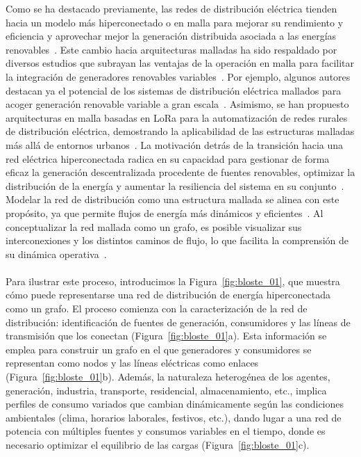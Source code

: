 Como se ha destacado previamente, las redes de distribución eléctrica tienden hacia un modelo más hiperconectado o en malla para mejorar su rendimiento y eficiencia y aprovechar mejor la generación distribuida asociada a las energías renovables~\cite{kafle2016towards}. Este cambio hacia arquitecturas malladas ha sido respaldado por diversos estudios que subrayan las ventajas de la operación en malla para facilitar la integración de generadores renovables variables~\cite{cruz2018meshed,cruz2018prospects}. Por ejemplo, algunos autores destacan ya el potencial de los sistemas de distribución eléctrica mallados para acoger generación renovable variable a gran escala~\cite{cruz2018prospects}. Asimismo, se han propuesto arquitecturas en malla basadas en LoRa para la automatización de redes rurales de distribución eléctrica, demostrando la aplicabilidad de las estructuras malladas más allá de entornos urbanos~\cite{prade2020lora}. La motivación detrás de la transición hacia una red eléctrica hiperconectada radica en su capacidad para gestionar de forma eficaz la generación descentralizada procedente de fuentes renovables, optimizar la distribución de la energía y aumentar la resiliencia del sistema en su conjunto~\cite{kafle2016towards}. Modelar la red de distribución como una estructura mallada se alinea con este propósito, ya que permite flujos de energía más dinámicos y eficientes~\cite{cruz2018meshed}. Al conceptualizar la red mallada como un grafo, es posible visualizar sus interconexiones y los distintos caminos de flujo, lo que facilita la comprensión de su dinámica operativa~\cite{zhou2021mesh}.\\
\\
Para ilustrar este proceso, introducimos la Figura~\ref{fig:bloste_01}, que muestra cómo puede representarse una red de distribución de energía hiperconectada como un grafo. El proceso comienza con la caracterización de la red de distribución: identificación de fuentes de generación, consumidores y las líneas de transmisión que los conectan (Figura~\ref{fig:bloste_01}a). Esta información se emplea para construir un grafo en el que generadores y consumidores se representan como nodos y las líneas eléctricas como enlaces (Figura~\ref{fig:bloste_01}b). Además, la naturaleza heterogénea de los agentes, generación, industria, transporte, residencial, almacenamiento, etc.,  implica perfiles de consumo variados que cambian dinámicamente según las condiciones ambientales (clima, horarios laborales, festivos, etc.), dando lugar a una red de potencia con múltiples fuentes y consumos variables en el tiempo, donde es necesario optimizar el equilibrio de las cargas (Figura~\ref{fig:bloste_01}c).

